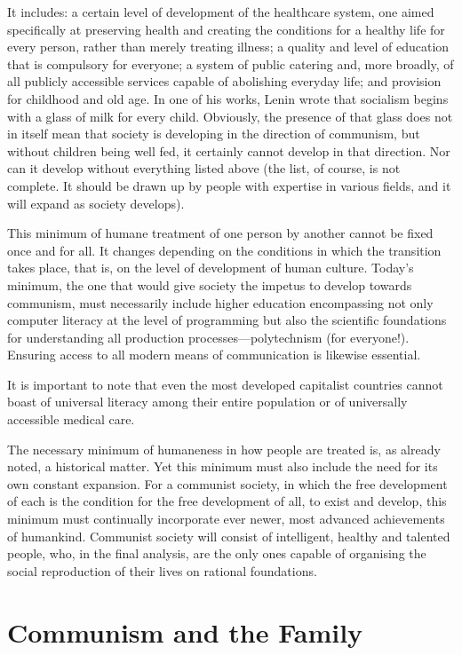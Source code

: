 \documentclass[12pt,a4paper,openany]{book}
\begin{document}
It includes: a certain level of development of the healthcare system, one aimed specifically at preserving health and creating the conditions for a healthy life for every person, rather than merely treating illness; a quality and level of education that is compulsory for everyone; a system of public catering and, more broadly, of all publicly accessible services capable of abolishing everyday life; and provision for childhood and old age. In one of his works, Lenin wrote that socialism begins with a glass of milk for every child. Obviously, the presence of that glass does not in itself mean that society is developing in the direction of communism, but without children being well fed, it certainly cannot develop in that direction. Nor can it develop without everything listed above (the list, of course, is not complete. It should be drawn up by people with expertise in various fields, and it will expand as society develops).

This minimum of humane treatment of one person by another cannot be fixed once and for all. It changes depending on the conditions in which the transition takes place, that is, on the level of development of human culture. Today’s minimum, the one that would give society the impetus to develop towards communism, must necessarily include higher education encompassing not only computer literacy at the level of programming but also the scientific foundations for understanding all production processes—polytechnism (for everyone!). Ensuring access to all modern means of communication is likewise essential.

It is important to note that even the most developed capitalist countries cannot boast of universal literacy among their entire population or of universally accessible medical care.

The necessary minimum of humaneness in how people are treated is, as already noted, a historical matter. Yet this minimum must also include the need for its own constant expansion. For a communist society, in which the free development of each is the condition for the free development of all, to exist and develop, this minimum must continually incorporate ever newer, most advanced achievements of humankind. Communist society will consist of intelligent, healthy and talented people, who, in the final analysis, are the only ones capable of organising the social reproduction of their lives on rational foundations.
\ifSubfilesClassLoaded{\setcounter{page}{50}}{}
\section{Communism and the Family}
\label{sec:09_communism_family}
\end{document}
